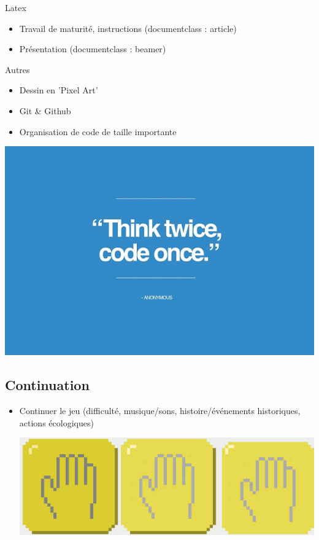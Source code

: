 \documentclass[11pt]{beamer}
\newcommand{\pauseditemize}{\pause \begin{itemize}[<+->]}
\begin{document}
\begin{frame}{Latex}
	
\pauseditemize
	\item Travail de maturité, instructions (documentclass : article)
	\item Présentation (documentclass : beamer)
\end{itemize}

\end{frame}

\begin{frame}{Autres}

\pauseditemize
	\item Dessin en 'Pixel Art'
	\item Git \& Github
	\item Organisation de code de taille importante
\end{itemize}

\pause
\begin{center}
	\includegraphics[scale=.3]{../images/Think-Twice-Code-Once}
\end{center}

\end{frame}

\subsection{Continuation}

\begin{frame}

\pauseditemize
	\item Continuer le jeu (difficulté, musique/sons, histoire/événements historiques, actions écologiques)
	\begin{center} 
		\includegraphics[scale=.08]{../images/ecoActions} 
	\end{center}
\end{itemize}

\end{frame}
\end{document}
